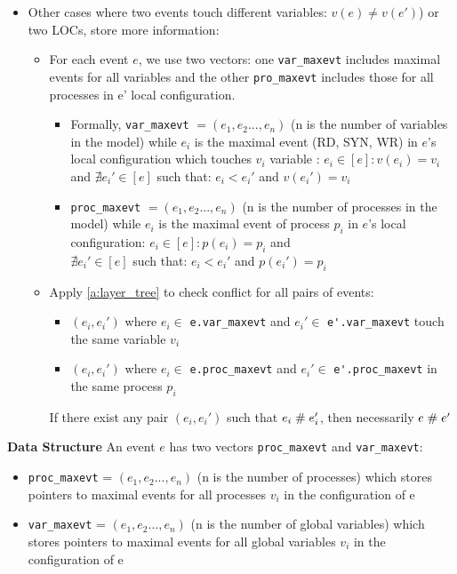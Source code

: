 \documentclass{llncs}
\begin{document}
\begin{enumerate}
\begin{itemize}
			\item Other cases where two events touch different variables: $v(e) \neq v(e')$) or two LOCs, store more information:	
			\begin{itemize}
				\item 
					For each event $e$, we use two vectors: one \verb!var_maxevt! includes maximal events  for all variables and 
					the other \verb!pro_maxevt! includes those for all processes in e' local configuration.
					\begin{itemize}
					\item
						Formally, \verb!var_maxevt! $ = (e_1, e_2...,e_n)$  (n is the number of variables in the model)
						while $e_i$ is the maximal event (RD, SYN, WR) in $e$'s local configuration which touches $v_i$ variable :
						$e_i \in  \left[ e \right]: v(e_i) = v_i$ and $ \nexists e_i' \in \left[ e \right] $ such that:
						$e_i < e_i'$ and $v(e_i') = v_i$ 
					\item
						\verb!proc_maxevt! $ = (e_1, e_2...,e_n)$  (n is the number of processes in the model)
						while $e_i$ is the maximal event of process $p_i$ in $e$'s local configuration:
						$e_i \in  \left[ e \right]: p(e_i) = p_i$ and \\
						$ \nexists e_i' \in \left[ e \right] $ such that:
						$e_i < e_i'$ and $p(e_i') = p_i$ 
					\end{itemize}				
				\item
					Apply \cref{a:layer_tree} to check conflict for all pairs of events:
					\begin{itemize}
						\item
							$(e_i, e_i')$ where $e_i \in $ \verb!e.var_maxevt! 	
							and $e_i'\in $ \verb!e'.var_maxevt! touch the same variable $v_i$
						\item
							$(e_i, e_i')$ where $e_i \in $ \verb!e.proc_maxevt! 	
							and $e_i'\in $ \verb!e'.proc_maxevt! in the same process $p_i$
					\end{itemize}
					
					If there exist any pair $(e_i, e_i')$ such that $e_i \mathrel{\#} e_i'$, then necessarily $e \mathrel{\#} e'$			
			\end{itemize}	
		\end{itemize}
\end{enumerate}

\noindent
\textbf{Data Structure}
An event $e$ has two vectors \verb!proc_maxevt! and \verb!var_maxevt!:
\begin{itemize}
	\item
		\verb!proc_maxevt! = $(e_1, e_2...,e_n)$ (n is the number of processes)
		which stores pointers to maximal events for all processes $v_i$ in the configuration of e
	\item
		\verb!var_maxevt! = $(e_1, e_2...,e_n)$ (n is the number of global variables)
		which stores pointers to maximal events for all global variables $v_i$ in the configuration of e	
\end{itemize}
\end{document}
